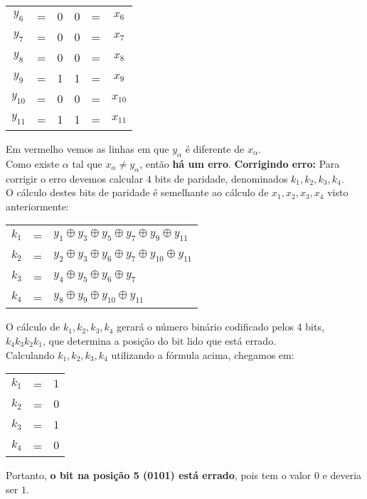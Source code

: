 \documentclass[12pt]{article}
\begin{document}
\begin{itemize}
\begin{center}
\begin{tabular}{ccc|ccc}
							$y_6$ & = & 0 & 0 & = & $x_6$\\
							$y_7$ & = & 0 & 0 & = & $x_7$\\
							$y_8$ & = & 0 & 0 & = & $x_8$\\
							$y_9$ & = & 1 & 1 & = & $x_9$\\
							$y_{10}$ & = & 0 & 0 & = & $x_{10}$\\
							$y_{11}$ & = & 1 & 1 & = & $x_{11}$\\
						\end{tabular}
					\end{center}
					Em \color{red}vermelho \color{black} vemos as linhas em que $y_\alpha$ é diferente
					de $x_\alpha$.\\
					Como existe $\alpha$ tal que $x_\alpha \neq y_\alpha$, então \textbf{há um erro}.
					\hfill\newline
					\subitem \textbf{Corrigindo erro:}
					\hfill\newline
					Para corrigir o erro devemos calcular 4 bits de paridade, denominados $k_1, k_2, k_3, k_4$.\\
					O cálculo destes bits de paridade é semelhante ao cálculo de $x_1, x_2, x_3, x_4$ visto
					anteriormente:
					\begin{center}
						\begin{tabular}{ccl}
							$k_1$ & = & $y_1 \oplus y_3 \oplus y_5 \oplus y_7 \oplus y_9 \oplus y_{11}$\\
							$k_2$ & = & $y_2 \oplus y_3 \oplus y_6 \oplus y_7 \oplus y_{10} \oplus y_{11}$\\
							$k_3$& = & $y_4 \oplus y_5 \oplus y_6 \oplus y_7$\\
							$k_4$ & = & $y_8 \oplus y_9 \oplus y_{10} \oplus y_{11}$\\
						\end{tabular}
					\end{center}
					O cálculo de $k_1, k_2, k_3, k_4$  gerará o número binário codificado pelos 4 bits,
					$k_4k_3k_2k_1$, que determina a posição do bit lido que está errado.\\
					Calculando $k_1, k_2, k_3, k_4$ utilizando a fórmula acima, chegamos em:\\
					\begin{center}
						\begin{tabular}{ccl}
							$k_1$ & = & $1$\\
							$k_2$ & = & $0$\\
							$k_3$& = & $1$\\
							$k_4$ & = & $0$\\
						\end{tabular}
					\end{center}
					Portanto, \textbf{o bit na posição 5 (0101) está errado}, pois tem o valor $0$ e 
					deveria ser $1$.
	\end{itemize}
\end{document}
